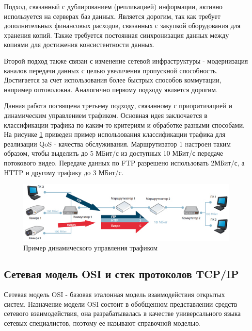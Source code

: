 Подход, связанный с дублированием (репликацией) информации, активно используется на серверах баз данных. Является дорогим, так как требует дополнительных финансовых расходов, связанных с закупкой оборудования для хранения копий. Также требуется постоянная синхронизация данных между копиями для достижения консистентности данных.

Второй подход также связан с изменение сетевой инфраструктуры - модернизация каналов передачи данных с целью увеличения пропускной способность. Достигается за счет использования более быстрых способов коммутации, например оптоволокна. Аналогично первому подходу является дорогим.

Данная работа посвящена третьему подходу, связанному с приоритизацией и динамическим управлением трафиком. Основная идея заключается в классификации трафика по каким-то критериям и обработке разными способами. На рисунке \ref{pic:qos_simple_example} приведен пример использования классификации трафика для реализации QoS - качества обслуживания. Маршрутизатор 1 настроен таким образом, чтобы выделить до 5 МБит/с из доступных 10 МБит/с передаче потокового видео. Передаче данных по FTP разрешено использовать 2МБит/с, а HTTP и другому трафику до 3 МБит/с.
\begin{figure}
\centering
\includegraphics[scale=0.7]{pictures/qos_simple_example}
\caption{Пример динамического управления трафиком}
\label{pic:qos_simple_example}
\end{figure}

\subsection{Сетевая модель OSI и стек протоколов TCP/IP}
Сетевая модель OSI - базовая эталонная модель взаимодействия открытых систем. Назначение модели OSI состоит в обобщенном представлении средств сетевого взаимодействия, она разрабатывалась в качестве универсального языка сетевых специалистов, поэтому ее называют справочной моделью.

